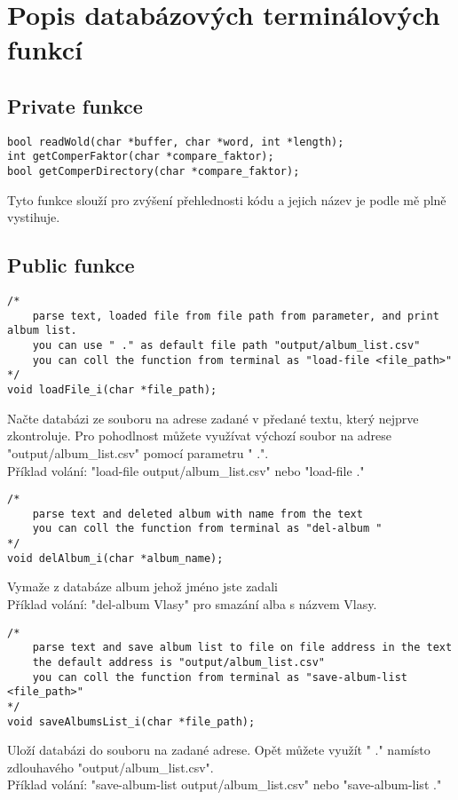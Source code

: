 \section{Popis databázových terminálových funkcí}
\subsection{Private funkce}

\begin{lstlisting}[style=CStyle]
bool readWold(char *buffer, char *word, int *length);
int getComperFaktor(char *compare_faktor);
bool getComperDirectory(char *compare_faktor);
\end{lstlisting}
Tyto funkce slouží pro zvýšení přehlednosti kódu a jejich název je podle mě plně vystihuje.

\subsection{Public funkce}
\begin{lstlisting}[style=CStyle]
/*
    parse text, loaded file from file path from parameter, and print album list.
    you can use " ." as default file path "output/album_list.csv"
    you can coll the function from terminal as "load-file <file_path>"
*/
void loadFile_i(char *file_path);
\end{lstlisting}
Načte databázi ze souboru na adrese zadané v předané textu, který nejprve zkontroluje.
Pro pohodlnost můžete využívat výchozí soubor na adrese "output/album\_list.csv" pomocí parametru " .".\\ 
Příklad volání: "load-file output/album\_list.csv" nebo "load-file ."

\begin{lstlisting}[style=CStyle]
/*
    parse text and deleted album with name from the text
    you can coll the function from terminal as "del-album "
*/
void delAlbum_i(char *album_name);
\end{lstlisting}
Vymaže z databáze album jehož jméno jste zadali\\ 
Příklad volání: "del-album Vlasy" pro smazání alba s názvem Vlasy.

\begin{lstlisting}[style=CStyle]
/*
    parse text and save album list to file on file address in the text 
    the default address is "output/album_list.csv"
    you can coll the function from terminal as "save-album-list <file_path>"
*/
void saveAlbumsList_i(char *file_path);
\end{lstlisting}
Uloží databázi do souboru na zadané adrese.
Opět můžete využít " ." namísto zdlouhavého "output/album\_list.csv".\\ 
Příklad volání: "save-album-list output/album\_list.csv" nebo "save-album-list ."

